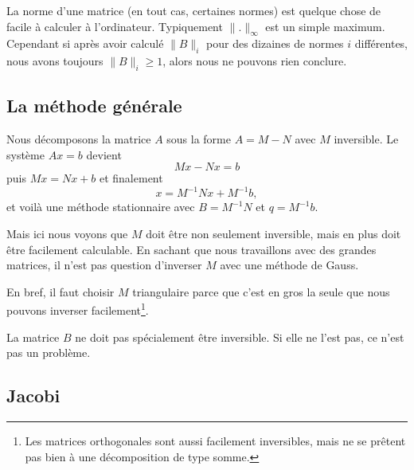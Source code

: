 La norme d'une matrice (en tout cas, certaines normes) est quelque chose de facile à calculer à l'ordinateur. Typiquement \( \| . \|_{\infty}\) est un simple maximum. Cependant si après avoir calculé \( \| B \|_i\) pour des dizaines de normes \( i\) différentes, nous avons toujours \( \| B\|_i\geq 1\), alors nous ne pouvons rien conclure.

\subsection{La méthode générale}

Nous décomposons la matrice \( A\) sous la forme \( A=M-N\) avec \( M\) inversible. Le système \( Ax=b\) devient
\begin{equation}
	Mx-Nx=b
\end{equation}
puis \( Mx=Nx+b\) et finalement
\begin{equation}
	x=M^{-1}Nx+M^{-1}b,
\end{equation}
et voilà une méthode stationnaire avec \( B=M^{-1}N\) et \( q=M^{-1}b\).

Mais ici nous voyons que \( M\) doit être non seulement inversible, mais en plus doit être facilement calculable. En sachant que nous travaillons avec des grandes matrices, il n'est pas question d'inverser \( M\) avec une méthode de Gauss.

En bref, il faut choisir \( M\) triangulaire parce que c'est en gros la seule que nous pouvons inverser facilement\footnote{Les matrices orthogonales sont aussi facilement inversibles, mais ne se prêtent pas bien à une décomposition de type somme.}.

\begin{remark}
	La matrice \( B\) ne doit pas spécialement être inversible. Si elle ne l'est pas, ce n'est pas un problème.
\end{remark}

\subsection{Jacobi}

